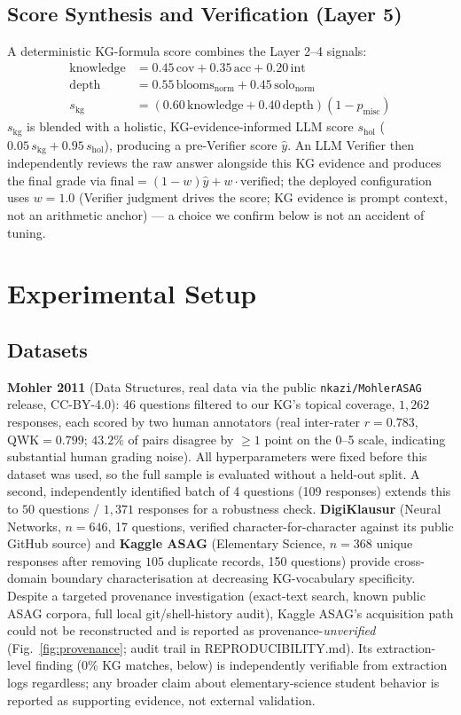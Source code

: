 \documentclass[conference]{IEEEtran}
\begin{document}
\subsection{Score Synthesis and Verification (Layer 5)}
A deterministic KG-formula score combines the Layer 2--4 signals:
\begin{align}
  \text{knowledge} &= 0.45\,\text{cov} + 0.35\,\text{acc} + 0.20\,\text{int} \nonumber \\
  \text{depth} &= 0.55\,\text{blooms}_{\text{norm}} + 0.45\,\text{solo}_{\text{norm}} \nonumber \\
  s_{\text{kg}} &= (0.60\,\text{knowledge} + 0.40\,\text{depth})(1-p_{\text{misc}})
\end{align}
$s_{\text{kg}}$ is blended with a holistic, KG-evidence-informed LLM score
$s_{\text{hol}}$ ($0.05\,s_{\text{kg}}+0.95\,s_{\text{hol}}$), producing a
pre-Verifier score $\hat{y}$. An LLM Verifier then independently reviews the
raw answer alongside this KG evidence and produces the final grade via
$\text{final}=(1-w)\hat{y}+w\cdot\text{verified}$; the deployed
configuration uses $w=1.0$ (Verifier judgment drives the score; KG evidence
is prompt context, not an arithmetic anchor) --- a choice we confirm below
is not an accident of tuning.

\section{Experimental Setup}

\subsection{Datasets}
\textbf{Mohler 2011} (Data Structures, real data via the public
\texttt{nkazi/MohlerASAG} release, CC-BY-4.0): 46 questions filtered to our
KG's topical coverage, $1{,}262$ responses, each scored by two human
annotators (real inter-rater $r=0.783$, QWK$=0.799$; $43.2\%$ of pairs
disagree by $\geq 1$ point on the 0--5 scale, indicating substantial human
grading noise). All hyperparameters were fixed before this dataset was used,
so the full sample is evaluated without a held-out split. A second,
independently identified batch of 4 questions (109 responses) extends this
to $50$ questions / $1{,}371$ responses for a robustness check.
\textbf{DigiKlausur} (Neural Networks, $n=646$, 17 questions, verified
character-for-character against its public GitHub source) and
\textbf{Kaggle ASAG} (Elementary Science, $n=368$ unique responses after
removing $105$ duplicate records, 150 questions) provide cross-domain
boundary characterisation at decreasing KG-vocabulary specificity.
Despite a targeted provenance investigation (exact-text search, known
public ASAG corpora, full local git/shell-history audit), Kaggle
ASAG's acquisition path could not be reconstructed and is reported as
provenance-\emph{unverified} (Fig.~\ref{fig:provenance}; audit trail in
REPRODUCIBILITY.md). Its extraction-level finding (0\% KG matches,
below) is independently verifiable from extraction logs regardless;
any broader claim about elementary-science student behavior is reported
as supporting evidence, not external validation.
\end{document}
